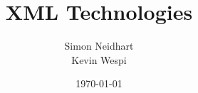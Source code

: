 \titlehead{Hochschule Luzern \\ 
	Technik \& Architektur}
\subject{Zusammenfassung}
\title{XML Technologies}
\subtitle{}
\author{Simon Neidhart \\ Kevin Wespi \\}
\date{\today}

\maketitle